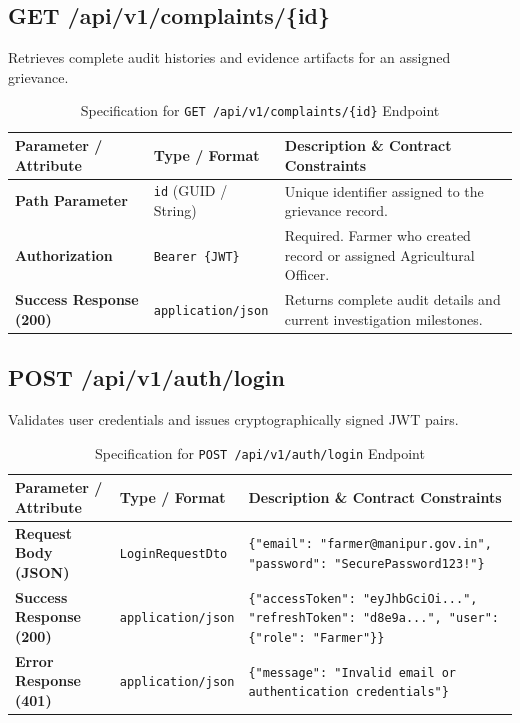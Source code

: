 \subsection*{GET /api/v1/complaints/\{id\}}
Retrieves complete audit histories and evidence artifacts for an assigned grievance.

\begin{table}[htbp]
  \centering
  \caption{Specification for \texttt{GET /api/v1/complaints/\{id\}} Endpoint}
  \label{tab:api-complaintget}
  \renewcommand{\arraystretch}{1.35}
  \begin{tabularx}{\textwidth}{@{} l l X @{}}
    \toprule
    \textbf{Parameter / Attribute} & \textbf{Type / Format} & \textbf{Description \& Contract Constraints} \\
    \midrule
    \textbf{Path Parameter} & \texttt{id} (GUID / String) & Unique identifier assigned to the grievance record. \\
    \addlinespace
    \textbf{Authorization} & \texttt{Bearer \{JWT\}} & Required. Farmer who created record or assigned Agricultural Officer. \\
    \addlinespace
    \textbf{Success Response (200)} & \texttt{application/json} & Returns complete audit details and current investigation milestones. \\
    \bottomrule
  \end{tabularx}
\end{table}

\subsection*{POST /api/v1/auth/login}
Validates user credentials and issues cryptographically signed JWT pairs.

\begin{table}[htbp]
  \centering
  \caption{Specification for \texttt{POST /api/v1/auth/login} Endpoint}
  \label{tab:api-authlogin}
  \renewcommand{\arraystretch}{1.35}
  \begin{tabularx}{\textwidth}{@{} l l X @{}}
    \toprule
    \textbf{Parameter / Attribute} & \textbf{Type / Format} & \textbf{Description \& Contract Constraints} \\
    \midrule
    \textbf{Request Body (JSON)} & \texttt{LoginRequestDto} & \texttt{\{"email": "farmer@manipur.gov.in", "password": "SecurePassword123!"\}} \\
    \addlinespace
    \textbf{Success Response (200)} & \texttt{application/json} & \texttt{\{"accessToken": "eyJhbGciOi...", "refreshToken": "d8e9a...", "user": \{"role": "Farmer"\}\}} \\
    \addlinespace
    \textbf{Error Response (401)} & \texttt{application/json} & \texttt{\{"message": "Invalid email or authentication credentials"\}} \\
    \bottomrule
  \end{tabularx}
\end{table}